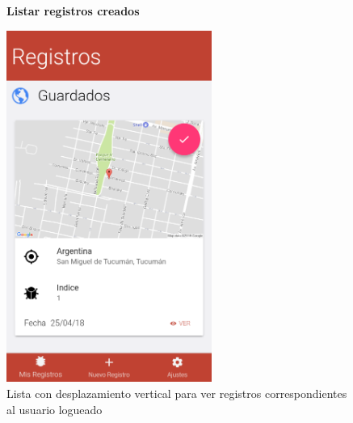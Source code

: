 				\begin{figure}[H]
					\hspace*{1cm}\raggedright\large\textbf{Listar registros creados}\par\medskip
					\centering
						\includegraphics[width=0.6\textwidth]{Screenshots/registrosLocales.png}
						\caption{Lista con desplazamiento vertical para ver registros correspondientes al usuario logueado}
				\end{figure}


